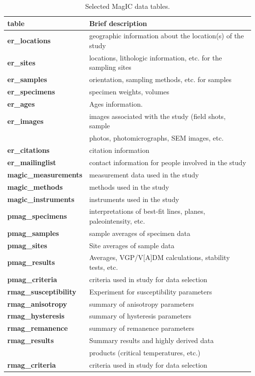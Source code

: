 \documentclass[11pt]{book}
\begin{document}
{{{\begin{table}[htb]
\caption{Selected MagIC data tables.}
\label{tab:tables}
\begin{tabular}{ll}
\hline
table&Brief description\\
\hline
{\bf er\_locations}& geographic information about the location(s) of the study\\
 {\bf er\_sites}& locations, lithologic information, etc. for the sampling sites\\
 {\bf er\_samples}& orientation, sampling methods, etc. for samples\\
  {\bf er\_specimens}&specimen weights, volumes\\
    {\bf er\_ages}&Ages information.\\
    {\bf er\_images}& images associated with the study (field shots, sample\\ 
    &photos, photomicrographs, SEM images, etc.\\
   {\bf er\_citations}&citation information\\
   {\bf er\_mailinglist}&contact information for people involved in the study\\
   \hline
   {\bf magic\_measurements}& measurement data used in the study\\
    {\bf magic\_methods}& methods used in the study\\
    {\bf magic\_instruments}& instruments used in the study\\
       \hline
    {\bf pmag\_specimens}& interpretations of best-fit lines, planes, paleointensity, etc. \\
{\bf pmag\_samples}&sample averages of specimen data\\
{\bf pmag\_sites}& Site averages of sample data\\
{\bf pmag\_results}& Averages, VGP/V[A]DM calculations, stability tests, etc.\\
{\bf pmag\_criteria}&criteria used in study for data selection\\
   \hline
   {\bf rmag\_susceptibility}&Experiment for susceptibility parameters\\
{\bf rmag\_anisotropy}& summary of anisotropy parameters\\
{\bf rmag\_hysteresis}& summary of hysteresis parameters\\
{\bf rmag\_remanence}&summary of remanence parameters\\
{\bf rmag\_results}&Summary results and highly derived data \\
&products (critical temperatures, etc.)\\
{\bf rmag\_criteria}&criteria used in study for data selection\\
\hline
\end{tabular}
\end{table}


}}}
\end{document}
